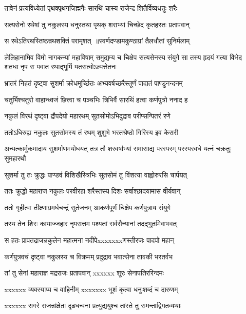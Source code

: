 \twolineshloka
{तावेनं प्रत्यविध्येतां पृथक्पृथगजिह्मगैः}
{सारथिं चास्य राजेन्द्र शितैर्विव्यधतुः शरैः}


\twolineshloka
{सत्यसेनो रथेषां तु नकुलस्य धनुस्तथा}
{पृथक् शराभ्यां चिच्छेद कृतहस्तः प्रतापवान्}


\twolineshloka
{स रथेऽतिरथस्तिष्ठन्रथशक्तिं परामृशत् ॥स्वर्णदण्डामकुण्ठाग्रां तैलधौतां सुनिर्मलाम्}
{}


लेलिहानामिव विमो नागकन्यां महाविषाम्
समुद्यम्य च चिक्षेप सत्यसेनस्य संयुगे
\twolineshloka
{सा तस्य हृदयं गत्या विभेद शतधा नृप}
{स पवात रथाद्भूमिं यतसत्वोऽल्पत्तेतनः}


\twolineshloka
{भ्रातरं निहतं दृष्ट्वा सुशर्मा क्रोधमूर्च्छितः}
{अभ्यवर्षच्छरैस्तूर्णं पादातं पाण्डुनन्दनम्}


\twolineshloka
{चतुर्भिश्चतुरो वाहान्ध्वजं छित्त्वा च पञ्चभिः}
{त्रिभिर्वै सारथिं हत्वा कर्णपुत्रो ननाद ह}


\twolineshloka
{नकुलं विरथं दृष्ट्वा द्रौपदेयो महारथम्}
{सुतसोमोऽभिदुद्राव परीप्सन्पितरं रणे}


\twolineshloka
{ततोऽधिरुह्य नकुलः सुतसोमस्य तं रथम्}
{शुशुभे भरतश्रेष्ठो गिरिस्य इव केसरी}


अन्यत्कार्मुकमादाय सुशर्माणमयोधयत्
\twolineshloka
{तत्र तौ शरवर्षाभ्यां समासाद्य परस्परम्}
{परस्परवधे यत्नं चक्रतुः सुमहारथौ}


\twolineshloka
{सुशर्मा तु तः क्रुद्धः पाण्डवं विशिखैस्त्रिभिः}
{सुतसोमं तु विंशत्या वाह्वोरुरसि चार्पयत्}


\twolineshloka
{ततः क्रुद्धो महाराज नकुलः परवीरहा}
{शरैस्तस्य दिशः सर्वाश्छादयामास वीर्यवान्}


\twolineshloka
{ततो गृहीत्वा तीक्ष्णाग्रमर्धचन्द्रं सुतेजनम्}
{आकर्णपूर्णं चिक्षेप कर्णपुत्राय संयुगे}


\twolineshloka
{तस्य तेन शिरः कायाज्जहार नृपसत्तम}
{पश्यतां सर्वसैन्यानां तदद्भुतमिवाभवत्}


\twolineshloka
{स हतः प्रापतद्राजन्नकुलेन महात्मना}
{नदीपेxxxxxxxणस्तीरजः पादपो महान्}


\twolineshloka
{कर्णपुत्रवचं दृष्ट्वा नकुलस्य च विक्रमम्}
{प्रदुद्राव भवात्सेना तावकी भरतर्वभ}


\twolineshloka
{तां तु सेनां महाराज्ञ मद्रराजः प्रतापवान्}
{xxxxxx शूरः सेनापतिररिन्दमः}


\twolineshloka
{xxxxxx व्यवस्याप्य च वाहिनीम्}
{xxxxxxx भूशं कृत्वा धनुःशब्दं च दारुणम्}


\twolineshloka
{xxxxxx सगरे राजन्रांक्षेता दृढधन्वना}
{प्रत्युद्ययुश्च तांस्ते तु समन्ताद्विगतव्यथाः}


